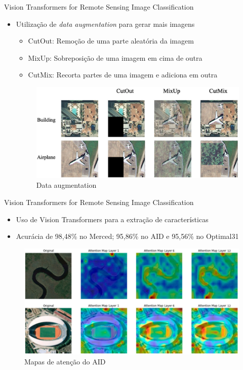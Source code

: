 
\begin{frame}{Vision Transformers for Remote Sensing Image Classification}
    \begin{itemize}
        \item Utilização de \textit{data augmentation} para gerar mais imagens
        \begin{itemize}
            \item CutOut: Remoção de uma parte aleatória da imagem
            \item MixUp: Sobreposição de uma imagem em cima de outra
            \item CutMix: Recorta partes de uma imagem e adiciona em outra
        \end{itemize}
        \begin{figure}
            \centering
            \includegraphics[width=0.75\linewidth]{TrabalhosRelacionados/DataAugmentation.png}
            \caption{Data augmentation}
        \end{figure}
    \end{itemize}
\end{frame}

\begin{frame}{Vision Transformers for Remote Sensing Image Classification}
    \begin{itemize}
        \item Uso de Vision Transformers para a extração de características
        \item Acurácia de 98,48\% no Merced; 95,86\% no AID e 95,56\% no Optimal31
    \end{itemize}
    \begin{figure}
        \centering
        \includegraphics[width=0.75\linewidth]{TrabalhosRelacionados/MapasDeAtençãoAID.png}
        \caption{Mapas de atenção do AID}
        \label{fig:enter-label}
    \end{figure}
    
\end{frame}

